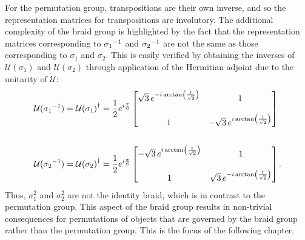 \begin{example}
    For the permutation group, transpositions are their own inverse, and so the representation matrices for transpositions are involutory. The additional complexity of the braid group is highlighted by the fact that the representation matrices corresponding to ${ \sigma_1 }^{-1}$ and ${ \sigma_2 }^{-1}$ are not the same as those corresponding to $\sigma_1$ and $\sigma_2$. This is easily verified by obtaining the inverses of $\mathcal{U}(\sigma_1)$ and $\mathcal{U}(\sigma_2)$ through application of the Hermitian adjoint due to the unitarity of $\mathcal{U}$:
    \begin{align*}
        \mathcal{U}({ \sigma_1 }^{-1}) &= {\mathcal{U}(\sigma_1)}^\dagger = \frac{1}{2}e^{i\frac{\pi}{6}}\begin{bmatrix}
            \sqrt{3}\,e^{-i\arctan\left( \frac{1}{\sqrt{2}} \right)} & 1 \\
            \\
            1 & -\sqrt{3}\,e^{i\arctan\left( \frac{1}{\sqrt{2}} \right)}
        \end{bmatrix} \\ 
        \\
        \mathcal{U}({ \sigma_2 }^{-1}) &= {\mathcal{U}(\sigma_2)}^\dagger = \frac{1}{2}e^{i\frac{\pi}{6}}\begin{bmatrix}
            -\sqrt{3}\,e^{i\arctan\left( \frac{1}{\sqrt{2}} \right)} & 1 \\
            \\
            1 & \sqrt{3}\,e^{-i\arctan\left( \frac{1}{\sqrt{2}} \right)}
        \end{bmatrix}.
    \end{align*}
    Thus, $\sigma_1^2$ and $\sigma_2^2$ are not the identity braid, which is in contrast to the permutation group. This aspect of the braid group results in non-trivial consequences for permutations of objects that are governed by the braid group rather than the permutation group. This is the focus of the following chapter.
\end{example}
